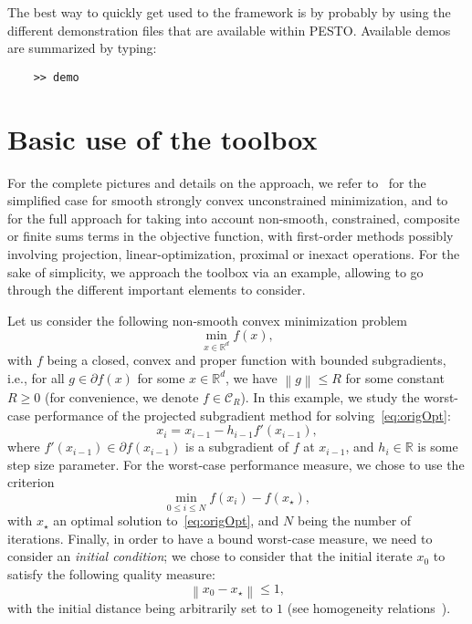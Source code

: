 \documentclass[11pt,a4paper]{article}
\newcommand{\norm}[1]{{\left\lVert#1\right\rVert}}
\newcommand{\Rd}{\mathbb{R}^d}
\newcommand{\real}{\mathbb{R}}
\begin{document}
	The best way to quickly get used to the framework is by probably by using the different demonstration files that are available within PESTO. Available demos are summarized by typing:
	\begin{verbatim}
	>> demo
	\end{verbatim}

	\clearpage

	\section{Basic use of the toolbox}	%
	\label{sec:basicuse}

	For the complete pictures and details on the approach, we refer to~\cite[Section 1\&3]{taylor2015smooth} for the simplified case for smooth strongly convex unconstrained minimization, and to~\cite[Section 1\&2]{taylor2015exact} for the full approach for taking into account non-smooth, constrained, composite or finite sums terms in the objective function, with first-order methods possibly involving projection, linear-optimization, proximal or inexact operations. For the sake of simplicity, we approach the toolbox via an example, allowing to go through the different important elements to consider.

	Let us consider the following non-smooth convex minimization problem
	\begin{equation}
	\min_{x\in\Rd} f(x),\tag{OPT}\label{eq:origOpt}
	\end{equation}
	with $f$ being a closed, convex and proper function with bounded subgradients, i.e., for all $g\in\partial f(x)$ for some $x\in\Rd$, we have $\norm{g}\leq R$ for some constant $R\geq 0$ (for convenience, we denote $f\in \mathcal{C}_R$).
	In this example, we study the worst-case performance of the projected subgradient method for solving~\eqref{eq:origOpt}:
	\begin{equation}
	x_{i}=x_{i-1}-h_{i-1}f'(x_{i-1}),\label{eq:subgrad}
	\end{equation}
	where  $f'(x_{i-1})\in\partial f(x_{i-1})$ is a subgradient of $f$ at $x_{i-1}$, and $h_i\in\real$ is some step size parameter. For the worst-case performance measure, we chose to use the criterion \[\min_{0\leq i\leq N} f(x_i)-f(x_\star),\]
	with $x_\star$ an optimal solution to~\eqref{eq:origOpt}, and $N$ being the number of iterations. Finally, in order to have a bound worst-case measure, we need to consider an \emph{initial condition}; we chose to consider that the initial iterate $x_0$ to satisfy the following quality measure:
	\[ \norm{x_0-x_\star}\leq 1,\] with the initial distance being arbitrarily set to $1$ (see homogeneity relations~\cite[Section 3.5]{taylor2015smooth}).
\end{document}
